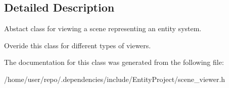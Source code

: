\subsection{Detailed Description}
Abstact class for viewing a scene representing an entity system. 

Overide this class for different types of viewers. 

The documentation for this class was generated from the following file\+:\begin{DoxyCompactItemize}
\item 
/home/user/repo/.\+dependencies/include/\+Entity\+Project/scene\+\_\+viewer.\+h\end{DoxyCompactItemize}
